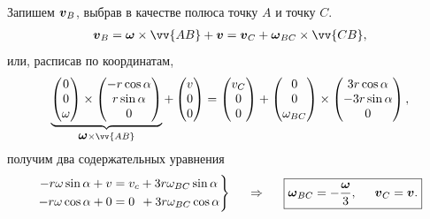 Запишем $\mbox{\boldmath $v$}_B$, выбрав в качестве полюса точку $A$ и точку $C$.
\begin{align}
\label{vb}
    \vc{v}_{B} = \vc{\omega} \times \vv{AB} + \vc{v} = \vc{v}_{C} + \vc{\omega}_{BC} \times \vv{CB},
\end{align}
или, расписав по координатам,
$$
\underbrace{\begin{pmatrix}
        0 \\ 0 \\ \omega
    \end{pmatrix} \times \begin{pmatrix}
        - r \cos \alpha \\
        r \sin \alpha \\
        0
    \end{pmatrix}}_{\vc{\omega} \times \vv{AB}}
    + \begin{pmatrix}
        v \\
        0 \\
        0
    \end{pmatrix} =
    \begin{pmatrix}
        v_C \\
        0 \\
        0
    \end{pmatrix} +
    \begin{pmatrix}
        0 \\
        0 \\
        \omega_{BC}
    \end{pmatrix} \times
    \begin{pmatrix}
        3r \cos \alpha \\
        -3r \sin \alpha \\
        0
    \end{pmatrix},
$$
получим два содержательных уравнения
$$
    \left.\begin{aligned}
        -r\omega \sin \alpha + v &= v_c + 3r \omega_{BC} \sin \alpha \\
        -r\omega \cos \alpha  + 0&= 0 \;\, + 3r \omega_{BC} \cos \alpha
    \end{aligned}\right\}
    \hspace{0.5cm} \Rightarrow \hspace{0.5cm} 
    \boxed{
    \mbox{\boldmath $\omega$}_{BC} = -\frac{\mbox{\boldmath $\omega$}}{3},
    \hspace{0.5cm} \mbox{\boldmath $v$}_C = \mbox{\boldmath $v$}.
    }
$$

\phantom{42}    

